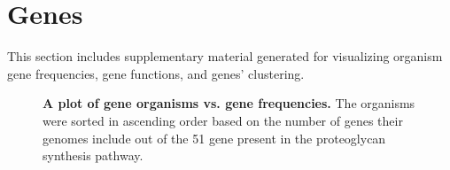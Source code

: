 \documentclass{article}
\begin{document}
\appendix

\section{Genes}
This section includes supplementary material generated for visualizing organism gene frequencies, gene functions, and genes' clustering.

\begin{figure}[H]
\centering
{}
\caption{\textbf{A plot of gene organisms vs. gene frequencies.} The organisms were sorted in ascending order based on the number of genes their genomes include out of the 51 gene present in the proteoglycan synthesis pathway.}
\label{sup_fig_1}
\end{figure}
\end{document}
